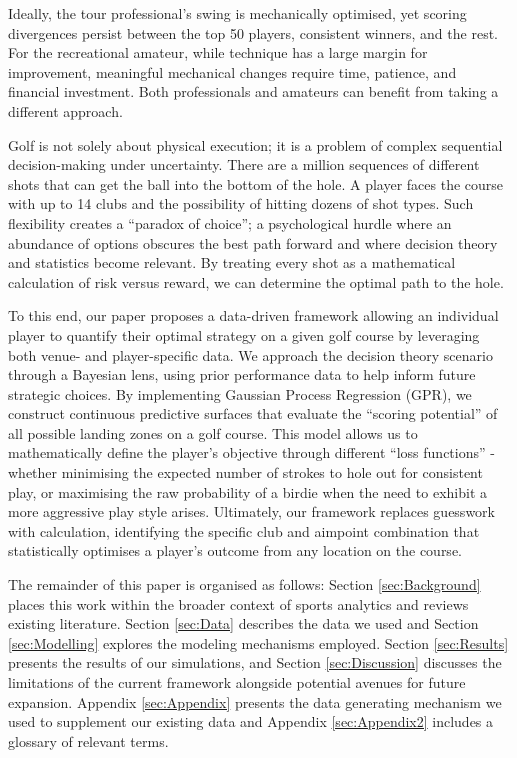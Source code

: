 \documentclass[11pt, letterpaper]{article}
\begin{document}
Ideally, the tour professional's swing is mechanically optimised, yet scoring divergences persist between the top 50 players, consistent winners, and the rest. For the recreational amateur, while technique has a large margin for improvement, meaningful mechanical changes require time, patience, and financial investment. Both professionals and amateurs can benefit from taking a different approach.

Golf is not solely about physical execution; it is a problem of complex sequential decision-making under uncertainty. There are a million sequences of different shots that can get the ball into the bottom of the hole. A player faces the course with up to 14 clubs and the possibility of hitting dozens of shot types. Such flexibility creates a ``paradox of choice''; a psychological hurdle where an abundance of options obscures the best path forward \parencite{schwartz2015paradox} and where decision theory and statistics become relevant. By treating every shot as a mathematical calculation of risk versus reward, we can determine the optimal path to the hole. 

To this end, our paper proposes a data-driven framework allowing an individual player to quantify their optimal strategy on a given golf course by leveraging both venue- and player-specific data. We 
approach the decision theory scenario through a Bayesian lens, using prior performance data to help inform future strategic choices. By implementing Gaussian Process Regression (GPR), we construct continuous predictive surfaces that evaluate the ``scoring potential'' of all possible landing zones on a golf course. This model allows us to mathematically define the player's objective through different ``loss functions'' - whether minimising the expected number of strokes to hole out for consistent play, or maximising the raw probability of a birdie when the need to exhibit a more aggressive play style arises. Ultimately, our framework replaces guesswork with calculation, identifying the specific club and aimpoint combination that statistically optimises a player's outcome from any location on the course.

The remainder of this paper is organised as follows: Section \ref{sec:Background} places this work within the broader context of sports analytics and reviews existing literature. Section \ref{sec:Data} describes the data we used and Section \ref{sec:Modelling} explores the modeling mechanisms employed. Section \ref{sec:Results} presents the results of our simulations, and Section \ref{sec:Discussion} discusses the limitations of the current framework alongside potential avenues for future expansion.  Appendix \ref{sec:Appendix} presents the data generating mechanism we used to supplement our existing data and Appendix \ref{sec:Appendix2} includes a glossary of relevant terms.
\end{document}
